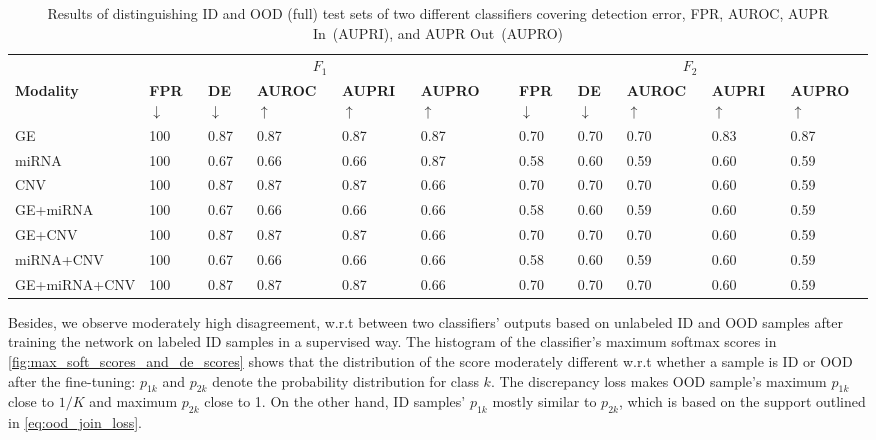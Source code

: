 \begin{table}[htp!]
	\centering
	\caption{Results of distinguishing ID and OOD (full) test sets of two different classifiers covering detection error, FPR, AUROC, AUPR In~(AUPRI), and AUPR Out~(AUPRO)} 
	\scriptsize{
	\vspace{-4mm}
	\begin{tabular}{llllllllllll}
		&\multicolumn{5}{c}{\bfseries{$F_1$}} && \multicolumn{5}{c}{\bfseries{$F_2$}} \\	
		\cmidrule{2-6}\cmidrule{8-12}   
		\textbf{Modality}&\textbf{FPR$\downarrow$} & \textbf{DE$\downarrow$} & \textbf{AUROC$\uparrow$} & \textbf{AUPRI$\uparrow$} & \textbf{AUPRO$\uparrow$}
		&& \textbf{FPR$\downarrow$} & \textbf{DE$\downarrow$} & \textbf{AUROC$\uparrow$} & \textbf{AUPRI$\uparrow$} & \textbf{AUPRO$\uparrow$}\\
		\hline
		\multirow{1}{*}{{GE}} & 100 & 0.87 & 0.87 & 0.87 & 0.87 && 0.70 & 0.70 & 0.70 & 0.83 & 0.87\\
		\hline
		\multirow{1}{*}{{miRNA}} & 100 & 0.67 & 0.66 & 0.66 & 0.87 && 0.58 & 0.60 & 0.59 & 0.60 & 0.59\\
		\hline
		\multirow{1}{*}{{CNV}} & 100 & 0.87 & 0.87 & 0.87 & 0.66 && 0.70 & 0.70 & 0.70 & 0.60 & 0.59\\
		\hline
		\multirow{1}{*}{{GE+miRNA}} & 100 & 0.67 & 0.66 & 0.66 & 0.66 && 0.58 & 0.60 & 0.59 & 0.60 & 0.59\\
		\hline
		\multirow{1}{*}{{GE+CNV}} & 100 & 0.87 & 0.87 & 0.87 & 0.66 && 0.70 & 0.70 & 0.70 & 0.60 & 0.59\\
		\hline
		\multirow{1}{*}{{miRNA+CNV}} & 100 & 0.67 & 0.66 & 0.66 & 0.66 && 0.58 & 0.60 & 0.59 & 0.60 & 0.59\\
		\hline
		\multirow{1}{*}{{GE+miRNA+CNV}} & 100 & 0.87 & 0.87 & 0.87 & 0.66 && 0.70 & 0.70 & 0.70 & 0.60 & 0.59\\
		\hline
	\end{tabular}}
	\vspace{-2mm}
	\label{Table:OOD_result_2}
\end{table}

\hspace*{3.5mm} Besides, we observe moderately high disagreement, w.r.t between two classifiers' outputs based on unlabeled ID and OOD samples after training the network on labeled ID samples in a supervised way. The histogram of the classifier's maximum softmax scores in \cref{fig:max_soft_scores_and_de_scores} shows that the distribution of the score moderately different w.r.t whether a sample is ID or OOD after the fine-tuning: $p_{1k}$ and $p_{2k}$ denote the probability distribution for class $k$. The discrepancy loss makes OOD sample's maximum $p_{1k}$ close to $1/K$ and maximum $p_{2k}$ close to 1. On the other hand, ID samples' $p_{1k}$ mostly similar to $p_{2k}$, which is based on the support outlined in \cref{eq:ood_join_loss}.

